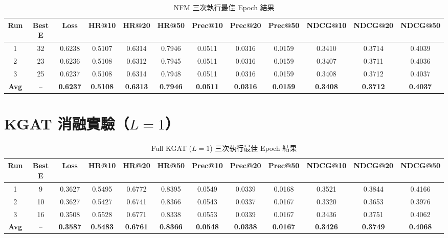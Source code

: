 \begin{table}[H]
  \centering
  \footnotesize
  \setlength{\tabcolsep}{3pt}
  \caption{NFM 三次執行最佳 Epoch 結果}
  \label{tab:nfm_runs}
  \begin{tabular}{c c c ccc ccc ccc}
    \toprule
    Run & Best E & Loss & HR@10 & HR@20 & HR@50 & Prec@10 & Prec@20 & Prec@50 & NDCG@10 & NDCG@20 & NDCG@50 \\
    \midrule
    1 & 32 & 0.6238 & 0.5107 & 0.6314 & 0.7946 & 0.0511 & 0.0316 & 0.0159 & 0.3410 & 0.3714 & 0.4039 \\
    2 & 23 & 0.6236 & 0.5108 & 0.6312 & 0.7945 & 0.0511 & 0.0316 & 0.0159 & 0.3407 & 0.3711 & 0.4036 \\
    3 & 25 & 0.6237 & 0.5108 & 0.6314 & 0.7948 & 0.0511 & 0.0316 & 0.0159 & 0.3408 & 0.3712 & 0.4037 \\
    \midrule
    \textbf{Avg} & -- & \textbf{0.6237} & \textbf{0.5108} & \textbf{0.6313} & \textbf{0.7946} & \textbf{0.0511} & \textbf{0.0316} & \textbf{0.0159} & \textbf{0.3408} & \textbf{0.3712} & \textbf{0.4037} \\
    \bottomrule
  \end{tabular}
\end{table}

\section{KGAT 消融實驗（$L{=}1$）}

\begin{table}[H]
  \centering
  \footnotesize
  \setlength{\tabcolsep}{3pt}
  \caption{Full KGAT ($L{=}1$) 三次執行最佳 Epoch 結果}
  \label{tab:full_kgat_runs}
  \begin{tabular}{c c c ccc ccc ccc}
    \toprule
    Run & Best E & Loss & HR@10 & HR@20 & HR@50 & Prec@10 & Prec@20 & Prec@50 & NDCG@10 & NDCG@20 & NDCG@50 \\
    \midrule
    1 & 9 & 0.3627 & 0.5495 & 0.6772 & 0.8395 & 0.0549 & 0.0339 & 0.0168 & 0.3521 & 0.3844 & 0.4166 \\
    2 & 10 & 0.3627 & 0.5427 & 0.6741 & 0.8366 & 0.0543 & 0.0337 & 0.0167 & 0.3320 & 0.3653 & 0.3976 \\
    3 & 16 & 0.3508 & 0.5528 & 0.6771 & 0.8338 & 0.0553 & 0.0339 & 0.0167 & 0.3436 & 0.3751 & 0.4062 \\
    \midrule
    \textbf{Avg} & -- & \textbf{0.3587} & \textbf{0.5483} & \textbf{0.6761} & \textbf{0.8366} & \textbf{0.0548} & \textbf{0.0338} & \textbf{0.0167} & \textbf{0.3426} & \textbf{0.3749} & \textbf{0.4068} \\
    \bottomrule
  \end{tabular}
\end{table}

